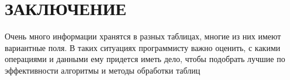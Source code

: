 \section*{ЗАКЛЮЧЕНИЕ}
Очень много информации хранятся в разных таблицах, многие из них имеют вариантные поля. В таких ситуациях программисту важно оценить, с какими операциями и данными ему придется иметь дело, чтобы подобрать лучшие по эффективности алгоритмы и методы обработки таблиц
